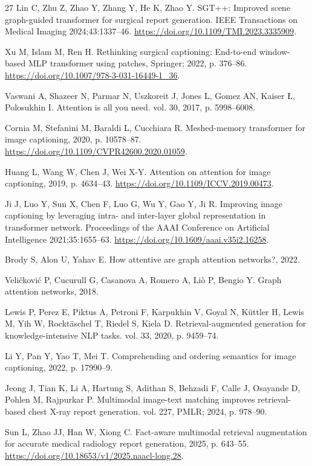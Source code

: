 \documentclass[11pt]{article}
\begin{document}
\begin{thebibliography}{27}
 Lin C, Zhu Z, Zhao Y, Zhang Y, He K, Zhao Y. SGT++: Improved scene graph-guided transformer for surgical report generation. IEEE Transactions on Medical Imaging 2024;43:1337--46. \url{https://doi.org/10.1109/TMI.2023.3335909}.

 Xu M, Islam M, Ren H. Rethinking surgical captioning: End-to-end window-based MLP transformer using patches, Springer; 2022, p. 376--86. \url{https://doi.org/10.1007/978-3-031-16449-1_36}.

 Vaswani A, Shazeer N, Parmar N, Uszkoreit J, Jones L, Gomez AN, Kaiser {\L}, Polosukhin I. Attention is all you need. vol. 30, 2017, p. 5998--6008.

 Cornia M, Stefanini M, Baraldi L, Cucchiara R. Meshed-memory transformer for image captioning, 2020, p. 10578--87. \url{https://doi.org/10.1109/CVPR42600.2020.01059}.

 Huang L, Wang W, Chen J, Wei X-Y. Attention on attention for image captioning, 2019, p. 4634--43. \url{https://doi.org/10.1109/ICCV.2019.00473}.

 Ji J, Luo Y, Sun X, Chen F, Luo G, Wu Y, Gao Y, Ji R. Improving image captioning by leveraging intra- and inter-layer global representation in transformer network. Proceedings of the AAAI Conference on Artificial Intelligence 2021;35:1655--63. \url{https://doi.org/10.1609/aaai.v35i2.16258}.

 Brody S, Alon U, Yahav E. How attentive are graph attention networks?, 2022.

 Veli\v{c}kovi\'{c} P, Cucurull G, Casanova A, Romero A, Li\`{o} P, Bengio Y. Graph attention networks, 2018.

 Lewis P, Perez E, Piktus A, Petroni F, Karpukhin V, Goyal N, K\"uttler H, Lewis M, Yih W, Rockt\"aschel T, Riedel S, Kiela D. Retrieval-augmented generation for knowledge-intensive NLP tasks. vol. 33, 2020, p. 9459--74.

 Li Y, Pan Y, Yao T, Mei T. Comprehending and ordering semantics for image captioning, 2022, p. 17990--9.

 Jeong J, Tian K, Li A, Hartung S, Adithan S, Behzadi F, Calle J, Osayande D, Pohlen M, Rajpurkar P. Multimodal image-text matching improves retrieval-based chest X-ray report generation. vol. 227, PMLR; 2024, p. 978--90.

 Sun L, Zhao JJ, Han W, Xiong C. Fact-aware multimodal retrieval augmentation for accurate medical radiology report generation, 2025, p. 643--55. \url{https://doi.org/10.18653/v1/2025.naacl-long.28}.


\end{thebibliography}
\end{document}
